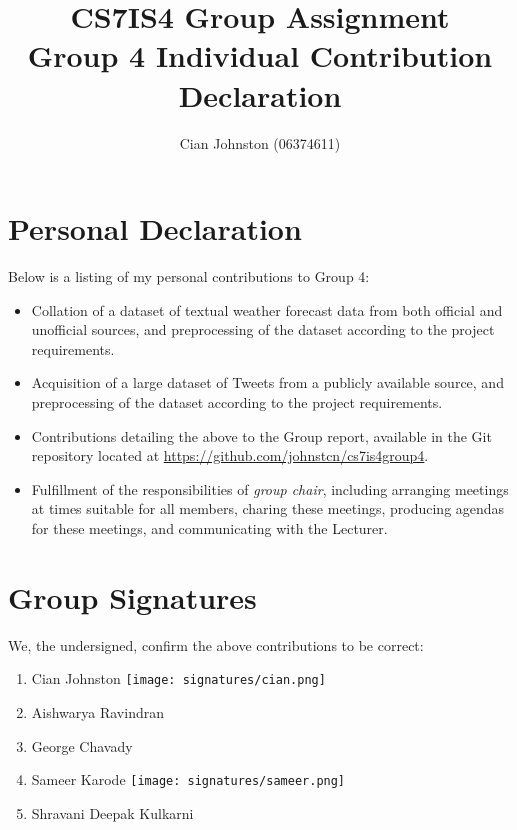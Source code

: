 \documentclass[a4paper,10pt]{article}
\begin{document}
\title{
    CS7IS4 Group Assignment \\
    \large Group 4 Individual Contribution Declaration
}
\author{
    Cian Johnston (06374611)
}

\maketitle

\section{Personal Declaration}

Below is a listing of my personal contributions to Group 4:

\begin{itemize}
    \item{
        Collation of a dataset of textual weather forecast data from both official and unofficial sources, and preprocessing of the dataset according to the project requirements.
    }
    \item{
        Acquisition of a large dataset of Tweets from a publicly available source, and preprocessing of the dataset according to the project requirements.
    }
    \item{
        Contributions detailing the above to the Group report, available in the Git repository located at \url{https://github.com/johnstcn/cs7is4group4}.
    }
    \item{
        Fulfillment of the responsibilities of \textit{group chair}, including arranging meetings at times suitable for all members, charing these meetings, producing agendas for these meetings, and communicating with the Lecturer. 
    }
\end{itemize}

\section{Group Signatures}

We, the undersigned, confirm the above contributions to be correct:

\begin{enumerate}
    \item{
        Cian Johnston \texttt{[image: signatures/cian.png]}
    }
    \item{
        Aishwarya Ravindran
    }
    \item{
        George Chavady
    }
    \item{
        Sameer Karode \texttt{[image: signatures/sameer.png]}
    }
    \item{
        Shravani Deepak Kulkarni
    }

\end{enumerate}
\end{document}
